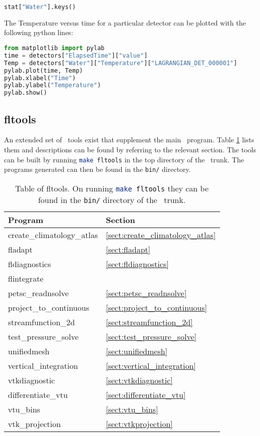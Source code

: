 \begin{lstlisting}[language=Python]
stat["Water"].keys()
\end{lstlisting}

The Temperature versus time for a particular detector can be plotted with the following python lines:

\begin{lstlisting}[language=Python]
from matplotlib import pylab
time = detectors["ElapsedTime"]["value"]
Temp = detectors["Water"]["Temperature"]["LAGRANGIAN_DET_000001"]
pylab.plot(time, Temp)
pylab.xlabel("Time")
pylab.ylabel("Temperature")
pylab.show()
\end{lstlisting}

\subsection{fltools}
\label{sect:fltools}
An extended set of \fluidity\ tools exist that supplement the main
\fluidity\ program. Table \ref{tab:fltools} lists them and descriptions can
be found by referring to the relevant section. The tools can be built by
running \lstinline[language = bash]+make fltools+ in the top directory of
the \fluidity\ trunk. The programs generated can then be found in the
\lstinline[language = bash]+bin/+ directory.

\begin{table}
\begin{center}
  \begin{tabular}{| l | l |}
    \hline
	Program					& Section 				\\
    \hline
	create\_climatology\_atlas		& \ref{sect:create_climatology_atlas}	\\
	fladapt					& \ref{sect:fladapt}			\\
	fldiagnostics				& \ref{sect:fldiagnostics}		\\		
	flintegrate				& \\
	petsc\_readnsolve			& \ref{sect:petsc_readnsolve} 		\\
	project\_to\_continuous			& \ref{sect:project_to_continuous} 	\\
	streamfunction\_2d			& \ref{sect:streamfunction_2d} 		\\	
	test\_pressure\_solve			& \ref{sect:test_pressure_solve}	\\
	unifiedmesh				& \ref{sect:unifiedmesh} 		\\	
    	vertical\_integration			& \ref{sect:vertical_integration} 	\\
	vtkdiagnostic				& \ref{sect:vtkdiagnostic}		\\
	differentiate\_vtu          & \ref{sect:differentiate_vtu}		\\
	vtu\_bins           & \ref{sect:vtu_bins}		\\
	vtk\_projection				& \ref{sect:vtkprojection}		\\
    \hline
  \end{tabular}
\end{center}
\caption[Table of fltools]{Table of fltools. On running \lstinline[language = bash]+make fltools+ they can be found in the \lstinline[language = bash]+bin/+ directory of the \fluidity\ trunk.}
\label{tab:fltools}
\end{table}

